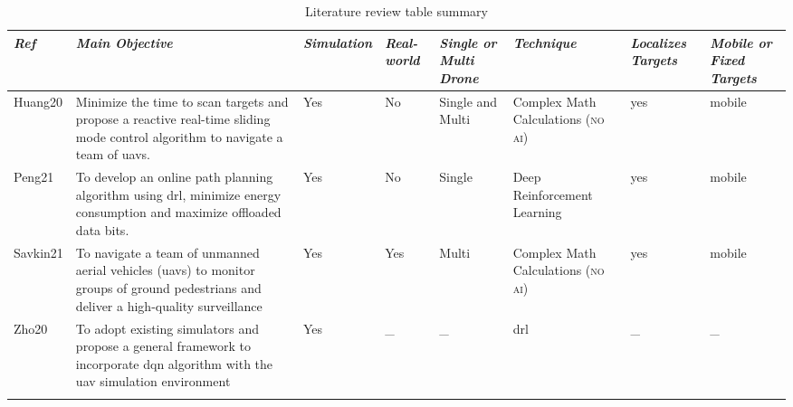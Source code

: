 \begin{table}[htb]
    \centering
    \small
    \caption{Literature review table summary}
    \label{tab:lit-summary}
    \begin{tabular}{ P{0.6cm} P{4cm} P{1.6cm} P{1.3cm} P{1.4cm} P{1.4cm} P{1.4cm} P{1.4cm} }
        \toprule
        \textit{Ref} 
            & \textit{Main Objective} 
                & \textit{Simulation} 
                    & \textit{Real-world} 
        & \textit{Single or Multi Drone} 
            & \textit{Technique} 
                & \textit{Localizes Targets}  
                    & \textit{Mobile or Fixed Targets} \\

        \midrule

        Huang20  
            & Minimize the time to scan targets and 
            propose a reactive real-time sliding 
            mode control algorithm to navigate a team 
            of \glspl{uav}. 
                & Yes
                    & No 
        & Single and Multi 
            & Complex Math Calculations (\textsc{no ai}) 
                & yes 
                    & mobile \\ \addlinespace

        Peng21  
            & To develop an online path planning 
            algorithm using \gls{drl}, minimize 
            energy consumption and maximize 
            offloaded data bits. 
                & Yes 
                    & No 
        & Single 
            & Deep Reinforcement Learning 
                & yes 
                    & mobile \\ \addlinespace

        Savkin21
            & To navigate a team of unmanned 
            aerial vehicles (\glspl{uav}) to 
            monitor groups of ground pedestrians 
            and deliver a high-quality surveillance 
                & Yes 
                    & Yes 
        & Multi 
            & Complex Math Calculations (\textsc{no ai}) 
                &yes 
                    & mobile \\ \addlinespace

        Zho20  
            & To adopt existing simulators and 
            propose a general framework to 
            incorporate \gls{dqn} algorithm with 
            the \gls{uav} simulation environment 
                & Yes 
                    & \_ 
        &\_ 
            & \gls{drl} 
                 & \_ 
                     & \_ \\ \addlinespace


\end{tabular}
\end{table}
